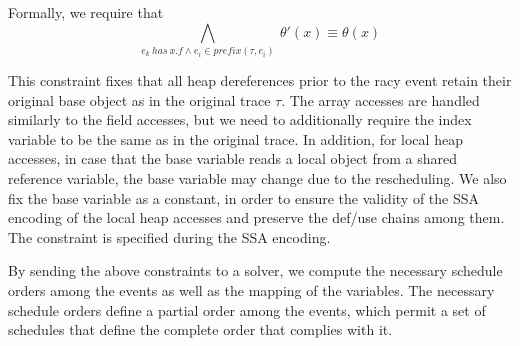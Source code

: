 Formally, we require that
$$
\bigwedge_{ e_k \ has\  x.f \wedge e_i \in prefix(\tau,e_i) }\
	\theta'(x) \equiv  \theta(x)
$$


This constraint fixes that all heap dereferences  prior to the racy event retain their original base object as in the original trace $\tau$. 
The array accesses are handled similarly to the field accesses, but we need to additionally require the index variable to be the same as in the original trace.
In addition, for local heap accesses, in case that the base variable reads a local object from a shared reference variable, the base variable may change due to the rescheduling. We also fix the base variable as a constant, in order to ensure the validity of the SSA encoding of the local heap accesses and preserve the def/use chains among them. The constraint is specified during the SSA encoding.




By sending the above constraints to a solver, we compute the necessary schedule orders among the events as well as the mapping of the variables. The necessary schedule orders define a partial order among the events, which permit a set of schedules that define the complete order that complies with it.


